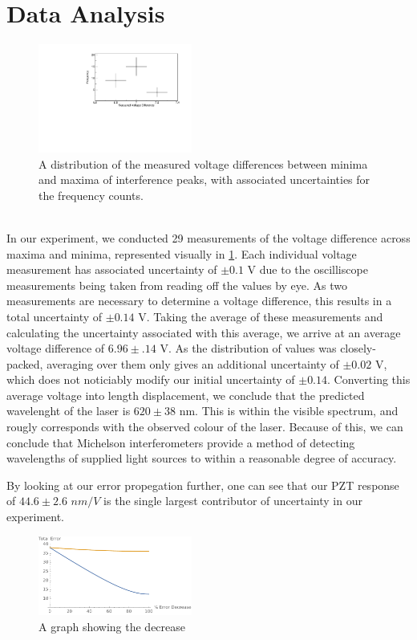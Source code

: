     \section{Data Analysis}
    \begin{figure}[t]
      \includegraphics[width=0.45\textwidth]{graph_helvetica.pdf}
      \caption{A distribution of the measured voltage differences between minima and maxima of interference peaks, with associated uncertainties for the frequency counts.}
      \label{fig:graph}
    \end{figure}
    \\
    In our experiment, we conducted 29 measurements of the voltage difference across maxima and minima, represented visually in \ref{fig:graph}. Each individual voltage measurement has associated uncertainty of $\pm 0.1$ V due to the oscilliscope measurements being taken from reading off the values by eye. As two measurements are necessary to determine a voltage difference, this results in a total uncertainty of $\pm 0.14$ V. Taking the average of these measurements and calculating the uncertainty associated with this average, we arrive at an average voltage difference of $6.96 \pm .14 $ V. As the distribution of values was closely-packed, averaging over them only gives an additional uncertainty of $\pm 0.02$ V, which does not noticiably modify our initial uncertainty of $\pm 0.14$. Converting this average voltage into length displacement, we conclude that the predicted wavelenght of the laser is $620 \pm 38$ nm. This is within the visible spectrum, and rougly corresponds with the observed colour of the laser. Because of this, we can conclude that Michelson interferometers provide a method of detecting wavelengths of supplied light sources to within a reasonable degree of accuracy.
    
    By looking at our error propegation further, one can see that our PZT response of $44.6 \pm 2.6$ $nm/V$ is the single largest contributor of uncertainty in our experiment.
    \begin{figure}[h]
      \includegraphics[width=0.45\textwidth]{error.pdf}
      \caption{A graph showing the decrease }
    \end{figure}
